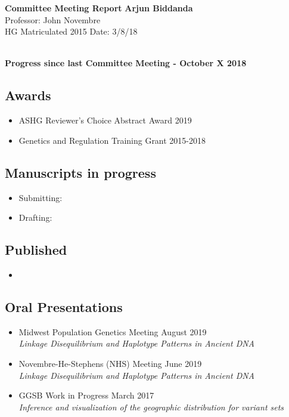 \documentclass[a4paper, 11pt]{article}
\begin{document}
\noindent
\large\textbf{Committee Meeting Report} \hfill \textbf{Arjun Biddanda} \\
\normalsize  \hfill Professor: John Novembre  \\
HG Matriculated 2015 \hfill Date: 3/8/18 \\
\noindent\makebox[\linewidth]{\rule{\paperwidth}{0.4pt}}

\large\textbf{\\Progress since last Committee Meeting - October X 2018}
\subsection*{Awards}
\begin{itemize}
    \item ASHG Reviewer's Choice Abstract Award  \hfill 2019 
    \item Genetics and Regulation Training Grant \hfill 2015-2018
\end{itemize} 

\subsection*{Manuscripts in progress}
\begin{itemize}
    \item Submitting: 
		\item Drafting:
\end{itemize}

\subsection*{Published}
\begin{itemize}
    \item {}
\end{itemize}

\subsection*{Oral Presentations}
\begin{itemize}
	\item Midwest Population Genetics Meeting \hfill August 2019 \\ \emph{Linkage Disequilibrium and Haplotype Patterns in Ancient DNA}
	\item Novembre-He-Stephens (NHS) Meeting \hfill June 2019 \\ \emph{Linkage Disequilibrium and Haplotype Patterns in Ancient DNA}   
	\item GGSB Work in Progress \hfill March 2017\\ \emph{Inference and visualization of the geographic distribution for variant sets}
\end{itemize}
\end{document}
